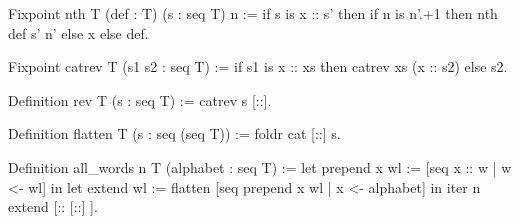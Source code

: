 \begin{Answer}[ref=ex:nth]

\begin{coq}{}{}
Fixpoint nth T (def : T) (s : seq T) n :=
  if s is x :: s' then if n is n'.+1 then nth def s' n' else x else def.
\end{coq}

\end{Answer}

\begin{Answer}[ref=ex:rev]

\begin{coq}{}{}
Fixpoint catrev T (s1 s2 : seq T) :=
  if s1 is x :: xs then catrev xs (x :: s2) else s2.

Definition rev T (s : seq T) := catrev s [::].
\end{coq}

\end{Answer}


\begin{Answer}[ref=ex:flatten]

\begin{coq}{}{}
Definition flatten T (s : seq (seq T)) := foldr cat [::] s.
\end{coq}

\end{Answer}

\begin{Answer}[ref=ex:allwords]

\begin{coq}{}{}
Definition all_words n T (alphabet : seq T) :=
  let prepend x wl := [seq x :: w | w <- wl] in
  let extend wl := flatten [seq prepend x wl | x <- alphabet] in
  iter n extend [:: [::] ].
\end{coq}

\end{Answer}



